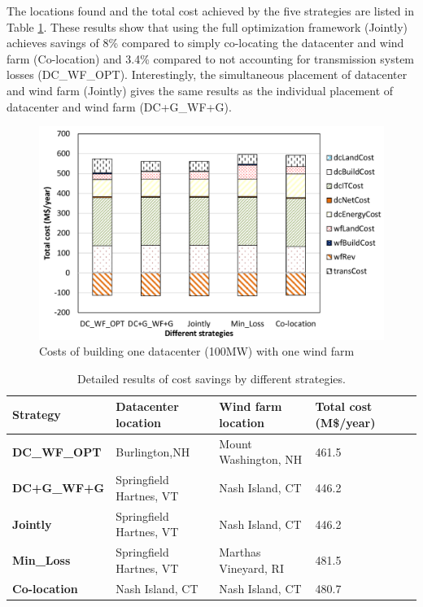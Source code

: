 The locations found and the total cost achieved by the five strategies
are listed in Table \ref{tab:costsaving}.  These results show that
using the full optimization framework (Jointly) achieves savings of
8\% compared to simply co-locating the datacenter and wind farm
(Co-location) and 3.4\% compared to not accounting for transmission
system losses (DC\_WF\_OPT).  Interestingly, the simultaneous
placement of datacenter and wind farm (Jointly) gives the same results
as the individual placement of datacenter and wind farm (DC+G\_WF+G).

\begin{figure}[ht]
\centering
\includegraphics[width=1\columnwidth]{img/cost-one-dc-one-wf}
\caption{Costs of building one datacenter (100MW) with one wind farm}
\label{fig:cost1dc1wf}
\end{figure}

\begin{table}[ht]
\begin{center}
\caption{Detailed results of cost savings by different strategies.}
\begin{tabular}{|l|p{50pt}|p{50pt}|p{30pt}|p{20pt}|}
\hline
\textbf{Strategy}& \textbf{Datacenter location} &\textbf{Wind farm location} &\textbf{Total cost (M\$/year)}%
 \\
\hline
\textbf{DC\_WF\_OPT} &  Burlington,NH  & Mount Washington, NH & 461.5%
\\
\textbf{DC+G\_WF+G} &Springfield Hartnes, VT  & Nash Island, CT& 446.2%
\\
\textbf{Jointly} &Springfield Hartnes, VT&  Nash Island, CT & 446.2%
\\
\textbf{Min\_Loss} &Springfield Hartnes, VT & Marthas Vineyard, RI & 481.5%
\\
\textbf{Co-location}& Nash Island, CT &Nash Island, CT& 480.7%
\\
\hline
\end{tabular}
\label{tab:costsaving}
\end{center}
\vspace{-0.2in}
\end{table}

